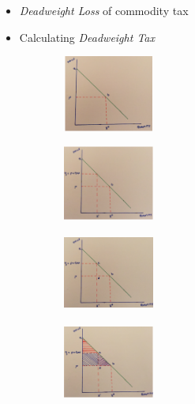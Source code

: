 \documentclass[11pt, english]{article}
\begin{document}
	\begin{itemize}
	\setlength\itemsep{0cm}
		\item \textit{Deadweight Loss} of commodity tax
		\item Calculating \textit{Deadweight Tax}
	\end{itemize}

	\begin{figure}[H]
        \begin{center}
                \begin{subfigure}[t]{4cm}
                \begin{center}
                        \includegraphics[width=3cm,height=2.5cm]{EC315-IMG/32.png}
                \end{center}
                \end{subfigure}
                \begin{subfigure}[t]{4cm}
                \begin{center}
                        \includegraphics[width=3cm,height=2.5cm]{EC315-IMG/33.png}
                \end{center}
                \end{subfigure}
                \begin{subfigure}[t]{4cm}
                \begin{center}
                        \includegraphics[width=3cm,height=2.5cm]{EC315-IMG/34.png}
                \end{center}
                \end{subfigure}
        \par
                \begin{subfigure}[t]{4cm}
                \begin{center}
                        \includegraphics[width=3cm,height=2.5cm]{EC315-IMG/35.png}
                \end{center}
                \end{subfigure}
        \end{center}
        \end{figure}
\end{document}
